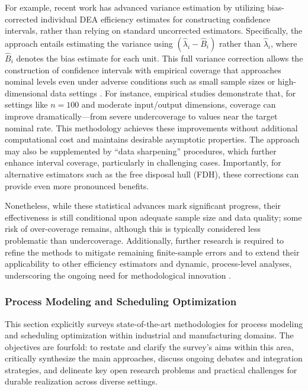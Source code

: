 \documentclass[sigconf]{acmart}
\begin{document}
For example, recent work has advanced variance estimation by utilizing bias-corrected individual DEA efficiency estimates for constructing confidence intervals, rather than relying on standard uncorrected estimators. Specifically, the approach entails estimating the variance using $(\hat{\lambda}_i - \hat{B}_i)$ rather than $\hat{\lambda}_i$, where $\hat{B}_i$ denotes the bias estimate for each unit. This full variance correction allows the construction of confidence intervals with empirical coverage that approaches nominal levels even under adverse conditions such as small sample sizes or high-dimensional data settings \cite{ref87}. For instance, empirical studies demonstrate that, for settings like $n=100$ and moderate input/output dimensions, coverage can improve dramatically—from severe undercoverage to values near the target nominal rate. This methodology achieves these improvements without additional computational cost and maintains desirable asymptotic properties. The approach may also be supplemented by ``data sharpening'' procedures, which further enhance interval coverage, particularly in challenging cases. Importantly, for alternative estimators such as the free disposal hull (FDH), these corrections can provide even more pronounced benefits.

Nonetheless, while these statistical advances mark significant progress, their effectiveness is still conditional upon adequate sample size and data quality; some risk of over-coverage remains, although this is typically considered less problematic than undercoverage. Additionally, further research is required to refine the methods to mitigate remaining finite-sample errors and to extend their applicability to other efficiency estimators and dynamic, process-level analyses, underscoring the ongoing need for methodological innovation \cite{ref87}.

\subsubsection{Process Modeling and Scheduling Optimization}

This section explicitly surveys state-of-the-art methodologies for process modeling and scheduling optimization within industrial and manufacturing domains. The objectives are fourfold: to restate and clarify the survey’s aims within this area, critically synthesize the main approaches, discuss ongoing debates and integration strategies, and delineate key open research problems and practical challenges for durable realization across diverse settings.
\end{document}

